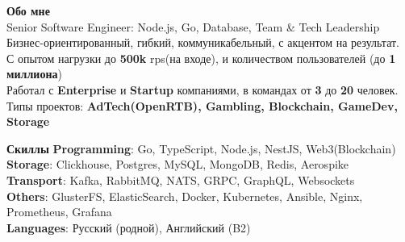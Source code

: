 \documentclass{resume}
\begin{document}

\begin{rSection}{\textbf{Обо мне}}
{
\\  Senior Software Engineer: Node.js, Go, Database, Team \& Tech Leadership
\\  Бизнес-ориентированный, гибкий, коммуникабельный, с акцентом на результат.
\\  С опытом нагрузки до \textbf{500k} rps(на входе), и количеством пользователей (до \textbf{1 миллиона})
\\  Работал с \textbf{Enterprise} и \textbf{Startup} компаниями, в командах от \textbf{3} до \textbf{20} человек.
\\  Типы проектов: \textbf{AdTech(OpenRTB), Gambling, Blockchain, GameDev, Storage}
}

\end{rSection}
\begin{rSection}{\textbf{Скиллы}}
    \textbf{Programming}: Go, TypeScript, Node.js, NestJS, Web3(Blockchain) \\
    \textbf{Storage}: Clickhouse, Postgres, MySQL, MongoDB, Redis, Aerospike \\
    \textbf{Transport}: Kafka, RabbitMQ, NATS, GRPC, GraphQL, Websockets \\
    \textbf{Others}: GlusterFS, ElasticSearch, Docker, Kubernetes, Ansible, Nginx, Prometheus, Grafana \\
    \textbf{Languages}: Русский (родной), Английский (B2)
\end{rSection}
\end{document}
